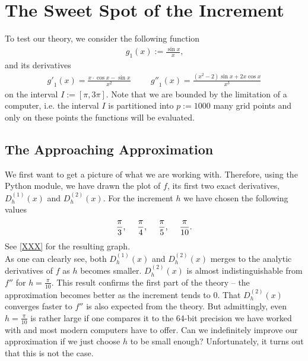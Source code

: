 \section{The Sweet Spot of the Increment}
To test our theory, we consider the following function
\begin{align*}
    g_1(x) := \frac{\sin{x}}{x} \text{,}
\end{align*}
and its derivatives
\begin{align*}
    {g'}_{1}(x) = \frac{x \cdot \cos{x} - \sin{x}}{x^2} \hspace{1cm} {g''}_{1}(x) = \frac{(x^2 - 2) \sin{x} + 2 x \cos{x}}{x^3} \text{}
\end{align*}
on the interval \(I := [\pi, 3\pi]\). Note that we are bounded by the limitation of a computer, i.e. the interval \(I\) is partitioned into \(p := 1000\) many grid points and only on these points the functions will be evaluated.


\subsection{The Approaching Approximation} %

We first want to get a picture of what we are working with. Therefore, using the Python module, we have drawn the plot of \(f\), its first two exact derivatives, \(D^{(1)}_h(x)\) and \(D^{(2)}_h(x)\). For the increment \(h\) we have chosen the following values
\begin{align*}
    \frac{\pi}{3} \text{,} \hspace{0.5cm} \frac{\pi}{4} \text{,} \hspace{0.5cm} \frac{\pi}{5} \text{,} \hspace{0.5cm} \frac{\pi}{10} \text{.}
\end{align*}
See \ref{XXX} for the resulting graph. \\


As one can clearly see, both \(D^{(1)}_h(x)\) and \(D^{(2)}_h(x)\) merges to the analytic derivatives of \(f\) as \(h\) becomes smaller. \(D^{(2)}_h(x)\) is almost indistinguishable from \(f''\) for \(h = \frac{\pi}{10}\). This result confirms the first part of the theory -- the approximation becomes better as the increment tends to \(0\). That \(D^{(2)}_h(x)\) converges faster to \(f''\) is also expected from the theory. But admittingly, even \(h = \frac{\pi}{10}\) is rather large if one compares it to the 64-bit precision we have worked with and most modern computers have to offer. Can we indefinitely improve our approximation if we just choose \(h\) to be small enough? Unfortunately, it turns out that this is not the case.

